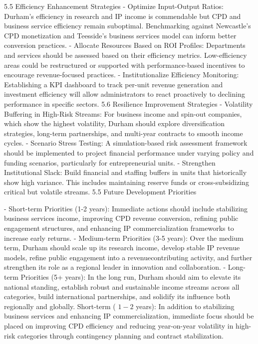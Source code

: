 5.5 Efficiency Enhancement Strategies
- Optimize Input-Output Ratios: Durham's efficiency in research and IP income is commendable but CPD and business service efficiency remain suboptimal. Benchmarking against Newcastle's CPD monetization and Teesside's business services model can inform better conversion practices.
- Allocate Resources Based on ROI Profiles: Departments and services should be assessed based on their efficiency metrics. Low-efficiency areas could be restructured or supported with performance-based incentives to encourage revenue-focused practices.
- Institutionalize Efficiency Monitoring: Establishing a KPI dashboard to track per-unit revenue generation and investment efficiency will allow administrators to react proactively to declining performance in specific sectors.
5.6 Resilience Improvement Strategies
- Volatility Buffering in High-Risk Streams: For business income and spin-out companies, which show the highest volatility, Durham should explore diversification strategies, long-term partnerships, and multi-year contracts to smooth income cycles.
- Scenario Stress Testing: A simulation-based risk assessment framework should be implemented to project financial performance under varying policy and funding scenarios, particularly for entrepreneurial units.
- Strengthen Institutional Slack: Build financial and staffing buffers in units that historically show high variance. This includes maintaining reserve funds or cross-subsidizing critical but volatile streams.
5.5 Future Development Priorities

- Short-term Priorities (1-2 years): Immediate actions should include stabilizing business services income, improving CPD revenue conversion, refining public engagement structures, and enhancing IP commercialization frameworks to increase early returns.
- Medium-term Priorities (3-5 years): Over the medium term, Durham should scale up its research income, develop stable IP revenue models, refine public engagement into a revenuecontributing activity, and further strengthen its role as a regional leader in innovation and collaboration.
- Long-term Priorities (5+ years): In the long run, Durham should aim to elevate its national standing, establish robust and sustainable income streams across all categories, build international partnerships, and solidify its influence both regionally and globally.
Short-term ( $1-2$ years): In addition to stabilizing business services and enhancing IP commercialization, immediate focus should be placed on improving CPD efficiency and reducing year-on-year volatility in high-risk categories through contingency planning and contract stabilization.

